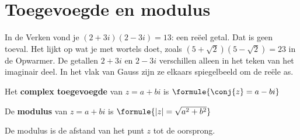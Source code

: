 
\begin{oefeningen}

\end{oefeningen}

\section{Toegevoegde en modulus}

In de Verken vond je $(2 + 3i)(2 - 3i) = 13$: een reëel getal. Dat is geen toeval. Het lijkt op wat je met wortels doet, zoals $(5 + \sqrt2)(5 - \sqrt2) = 23$ in de Opwarmer. De getallen $2 + 3i$ en $2 - 3i$ verschillen alleen in het teken van het imaginair deel. In het vlak van Gauss zijn ze elkaars spiegelbeeld om de reële as.

\begin{theorie}
\begin{minipage}[t]{.6\linewidth}
\vspace{0pt}
Het \textbf{\textcolor{accent}{complex toegevoegde}} van $z = a + bi$ is \quad $\formule{\conj{z} = a - bi}$

\vspace{1.5mm}
De \textbf{\textcolor{accent}{modulus}} van $z = a + bi$ is \quad $\formule{|z| = \sqrt{a^2 + b^2}}$

\vspace{1mm}
De modulus is de afstand van het punt $z$ tot de oorsprong.
\end{minipage}\hfill
\begin{minipage}[t]{.36\linewidth}
\vspace{0pt}
\end{minipage}
\end{theorie}

